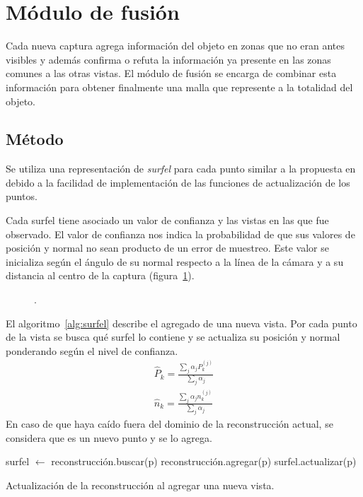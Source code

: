 \section{Módulo de fusión}
	Cada nueva captura agrega información del objeto en zonas que no eran antes visibles
	y además confirma o refuta la información ya presente en las zonas comunes a las otras vistas.
	El módulo de fusión se encarga de combinar esta información para obtener
	finalmente una malla que represente a la totalidad del objeto.



	\subsection{Método}
	Se utiliza una representación de \emph{surfel} para cada punto similar a la propuesta en \cite{5457479} %
	debido a la facilidad de implementación de las funciones de actualización de los puntos.

	Cada surfel tiene asociado un valor de confianza y las vistas en las que
	fue observado.  El valor de confianza nos indica la probabilidad de que sus
	valores de posición y normal no sean producto de un error de muestreo.
	Este valor se inicializa según el ángulo de su normal respecto a la línea
	de la cámara y a su distancia al centro de la captura (figura~\ref{fig:confianza_surfel}).

	\begin{figure}
		\caption{\label{fig:confianza_surfel}.}
	\end{figure}


	El algoritmo~\ref{alg:surfel} describe el agregado de una nueva vista.
	Por cada punto de la vista se busca qué surfel lo contiene y se actualiza
	su posición y normal ponderando según el nivel de confianza.
	\begin{eqnarray*}
		\hat{P}_k = \frac{\sum_{j} \alpha_j P^{(j)}_k}{\sum_{j} \alpha_j} \\
		\hat{n}_k = \frac{\sum_{j} \alpha_j n^{(j)}_k}{\sum_{j} \alpha_j}
	\end{eqnarray*}
	En caso de que haya caído fuera del dominio de la reconstrucción actual, se
	considera que es un nuevo punto y se lo agrega.

	\begin{algorithm}
		\begin{algorithmic}[1]
					\State surfel $\gets$ reconstrucción.buscar(p)
						\State reconstrucción.agregar(p)
					\Else
						\State surfel.actualizar(p)
					\EndIf
				\EndFor
			\EndFunction
		\end{algorithmic}
		\caption{\label{alg:surfel}Actualización de la reconstrucción al agregar una nueva vista.}
	\end{algorithm}

